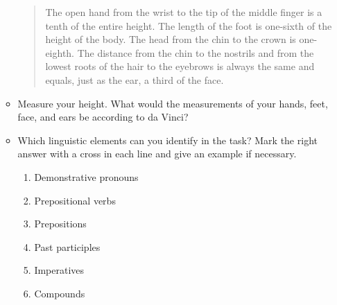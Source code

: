 \documentclass[output=paper]{langscibook}
\begin{document}
\begin{enumerate}[label=\Alph*.]
\begin{itemize}
\begin{quote}
The open hand from the wrist to the tip of the middle finger is a tenth of   the entire height. The length of the  foot is one-sixth of the height of the body. The head from the chin to the crown is one-eighth. The distance  from the chin to the nostrils and     from the lowest roots of the hair to    the eyebrows is always the same and equals, just as the ear, a third of the face.
\end{quote}


\item Measure your height. What would the measurements of your hands, feet,  face, and ears be according to da Vinci?

\item Which linguistic elements can you identify in the task? Mark the right answer with a cross in each line and give an example if necessary.

\begin{enumerate}
\item Demonstrative pronouns
\item Prepositional verbs
\item Prepositions
\item Past participles
\item Imperatives
\item Compounds
\end{enumerate}

\end{itemize}
\end{enumerate}

\end{document}
